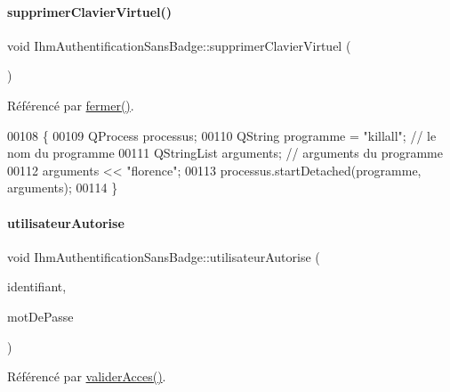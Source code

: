 \paragraph{\texorpdfstring{supprimer\+Clavier\+Virtuel()}{supprimerClavierVirtuel()}}
{\footnotesize\ttfamily void Ihm\+Authentification\+Sans\+Badge\+::supprimer\+Clavier\+Virtuel (\begin{DoxyParamCaption}{ }\end{DoxyParamCaption})\hspace{0.3cm}{\ttfamily [private]}}



Référencé par \hyperlink{class_ihm_authentification_sans_badge_aa06ddc2a4b8d578fecfb9e37dd577858}{fermer()}.


\begin{DoxyCode}
00108 \{
00109     QProcess processus;
00110     QString programme = \textcolor{stringliteral}{"killall"}; \textcolor{comment}{// le nom du programme}
00111     QStringList arguments; \textcolor{comment}{// arguments du programme}
00112     arguments << \textcolor{stringliteral}{"florence"};
00113     processus.startDetached(programme, arguments);
00114 \}
\end{DoxyCode}
\mbox{\label{class_ihm_authentification_sans_badge_a610528b307f2a3f3253aed3b5f628837}} 
\paragraph{\texorpdfstring{utilisateur\+Autorise}{utilisateurAutorise}}
{\footnotesize\ttfamily void Ihm\+Authentification\+Sans\+Badge\+::utilisateur\+Autorise (\begin{DoxyParamCaption}\item[{Q\+String}]{identifiant,  }\item[{Q\+String}]{mot\+De\+Passe }\end{DoxyParamCaption})\hspace{0.3cm}{\ttfamily [signal]}}



Référencé par \hyperlink{class_ihm_authentification_sans_badge_a1d6f062da30edd3ba8fe74906e8f16cf}{valider\+Acces()}.

\mbox{\label{class_ihm_authentification_sans_badge_a1d6f062da30edd3ba8fe74906e8f16cf}} 
